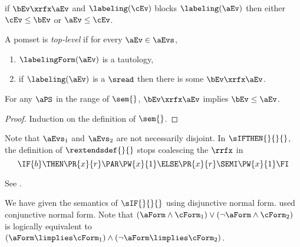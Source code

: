 \begin{definition}
\begin{enumerate}[,label=(\textsc{m}\arabic*),ref=\textsc{m}\arabic*]
\begin{enumerate}
        if $\bEv\xrfx\aEv$ and $\labeling(\cEv)$ blocks $\labeling(\aEv)$ then either $\cEv\le\bEv$ or $\aEv\le\cEv$.
    \end{enumerate}
  \end{enumerate}
  A pomset is \emph{top-level} if for every $\aEv\in\aEvs$,
  \begin{enumerate}[resume,label=(\textsc{m}\arabic*),ref=\textsc{m}\arabic*]
  \item \label{top-true}
    $\labelingForm(\aEv)$ is a tautology,    
  \item \label{top-rf}
    if $\labeling(\aEv)$ is a $\sread$ then there is some $\bEv\xrfx\aEv$.
  \end{enumerate}
\end{definition}

\begin{lemma}
  For any $\aPS$ in the range of $\sem{}$, $\bEv\xrfx\aEv$ implies
  $\bEv\le\aEv$.

  \vspace{-.5\baselineskip}
  \begin{proof}
    Induction on the definition of $\sem{}$.
  \end{proof}
\end{lemma}


Note that $\aEvs_1$ and $\aEvs_2$ are not necessarily disjoint.
In $\sIFTHEN{}{}{}$, the definition of $\rextendsdef{}{}$ stops coalescing the $\rrfx$ in
\begin{displaymath}
  \IF{b}\THEN\PR{x}{r}\PAR\PW{x}{1}\ELSE\PR{x}{r}\SEMI\PW{x}{1}\FI
\end{displaymath}

See .


We have given the semantics of $\sIF{}{}{}$ using 
disjunctive normal form. \citet{DBLP:journals/cacm/Dijkstra75} used
conjunctive normal form.  Note that 
\href{https://www.wolframalpha.com/input/?i=\%28a+and+b\%29+or+\%28not+a+and+c\%29}{$(\aForm\land\cForm_1)\lor(\neg\aForm\land\cForm_2)$}
is logically equivalent to
\href{https://www.wolframalpha.com/input/?i=\%28a+implies+b\%29+and+\%28\%28not+a\%29+implies+c\%29}{$(\aForm\limplies\cForm_1)\land(\neg\aForm\limplies\cForm_2)$}.

